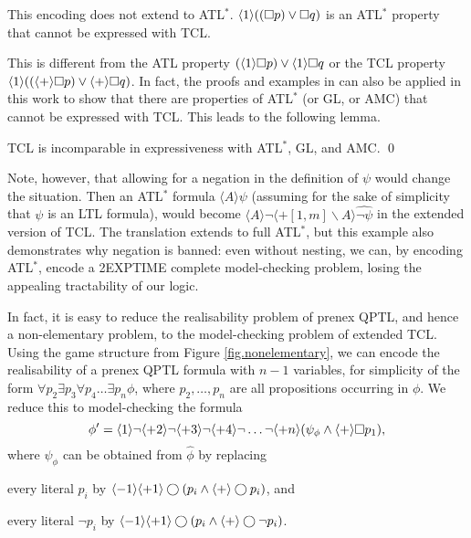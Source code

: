 This encoding does not extend to ATL$^*$.
$\langle 1\rangle ((\Box p)\vee \Box q)$  is an ATL$^*$ property that cannot be 
expressed with TCL.

This is different from the 
ATL property $(\langle 1\rangle \Box p)\vee \langle 1\rangle\Box q$ 
or the
TCL property
\mbox{$\langle 1\rangle ((\langle+\rangle\Box p)\vee \langle +\rangle\Box q)$}. 
In fact, the proofs and examples in \cite{WHY11} 
can also be applied in this work to show that 
there are properties of ATL$^*$ (or GL, or AMC) 
that cannot be expressed with TCL.  
This leads to the following lemma. 

{\lemma \label{lemma.express.incomp2} 
TCL is incomparable in expressiveness with ATL$^*$, GL, and AMC.  
} 
\qed 

Note, however, that allowing for a negation in the definition of $\psi$ would change the situation.
Then an ATL$^*$ formula $\langle A \rangle \psi$ 
(assuming for the sake of simplicity that $\psi$ is an LTL formula), 
would become
$\langle A \rangle \neg \langle + [1,m] \smallsetminus A \rangle \widehat{\neg \psi}$ in the extended version of TCL.
The translation extends to full ATL$^*$, but this example also demonstrates why negation is banned: even without nesting, we can, by encoding ATL$^*$, encode a 2EXPTIME complete model-checking problem, losing the appealing tractability of our logic.

In fact, it is easy to reduce the realisability problem of prenex QPTL, and hence a non-elementary problem, to the model-checking problem of extended TCL.
Using the game structure from Figure \ref{fig.nonelementary}, we can encode the realisability of a prenex QPTL formula with $n-1$ variables, for simplicity of the form
$\forall p_2 \exists p_3 \forall p_4 \ldots \exists p_n \phi$, where $p_2,\ldots,p_n$ are all propositions occurring in $\phi$.
We reduce this to model-checking the formula 
\[\phi'=\langle 1 \rangle \neg \langle +2 \rangle \neg \langle +3 \rangle \neg \langle +4 \rangle \neg \ldots \neg \langle +n \rangle (\psi_\phi \wedge \langle + \rangle \Box p_1),\]
where $\psi_\phi$ can be obtained from $\widehat{\phi}$ by replacing
\begin{list1}
\item every literal $p_i$ by $\langle - 1 \rangle \langle + 1 \rangle \bigcirc (p_i \wedge \langle + \rangle \bigcirc p_i)$, and
\item every literal $\neg p_i$ by $\langle - 1 \rangle \langle + 1 \rangle \bigcirc (p_i \wedge \langle + \rangle \bigcirc \neg p_i)$.
\end{list1}

